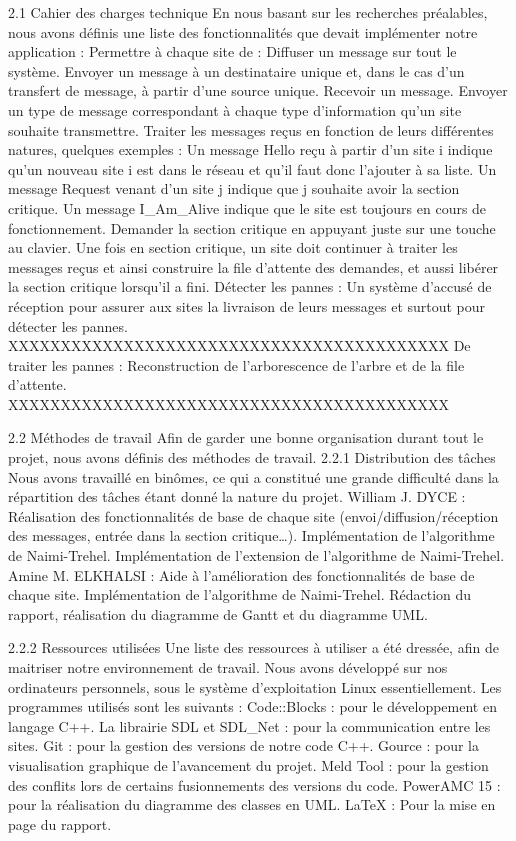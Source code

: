 \documentclass[a4paper,french,towsides,10pt]{book}
\begin{document}
2.1 Cahier des charges technique
En nous basant sur les recherches préalables, nous avons définis une liste des fonctionnalités que devait implémenter notre application :
Permettre à chaque site de :
Diffuser un message sur tout le système.
Envoyer un message à un destinataire unique et, dans le cas d’un transfert de message, à partir d’une source unique.
Recevoir un message.
Envoyer un type de message correspondant à chaque type d’information qu’un site souhaite transmettre.
Traiter les messages reçus en fonction de leurs différentes natures, quelques exemples :
Un message Hello reçu à partir d’un site i indique qu’un nouveau site i est dans le réseau et qu’il faut donc l’ajouter à sa liste.
Un message Request venant d’un site j indique que j souhaite avoir la section critique.
Un message I\_Am\_Alive indique que le site est toujours en cours de fonctionnement.
Demander la section critique en appuyant juste sur une touche au clavier.
Une fois en section critique, un site doit continuer à traiter les messages reçus et ainsi construire la file d’attente des demandes, et aussi libérer la section critique lorsqu’il a fini.
Détecter les pannes :
Un système d’accusé de réception pour assurer aux sites la livraison de leurs messages et surtout pour détecter les pannes.
XXXXXXXXXXXXXXXXXXXXXXXXXXXXXXXXXXXXXXXXXX
De traiter les pannes :
Reconstruction de l’arborescence de l’arbre et de la file d’attente.
XXXXXXXXXXXXXXXXXXXXXXXXXXXXXXXXXXXXXXXXXX



2.2 Méthodes de travail
	Afin de garder une bonne organisation durant tout le projet, nous avons définis des méthodes de travail.
2.2.1 Distribution des tâches
	Nous avons travaillé en binômes, ce qui a constitué une grande difficulté dans la répartition des tâches étant donné la nature du projet.
William J. DYCE : Réalisation des fonctionnalités de base de chaque site (envoi/diffusion/réception des messages, entrée dans la section critique…). Implémentation de l’algorithme de Naimi-Trehel. Implémentation de l’extension de l’algorithme de Naimi-Trehel.
Amine M. ELKHALSI : Aide à l’amélioration des fonctionnalités de base de chaque site. Implémentation de l’algorithme de Naimi-Trehel. Rédaction du rapport, réalisation du diagramme de Gantt et du diagramme UML.

2.2.2 Ressources utilisées
Une liste des ressources à utiliser a été dressée, afin de maitriser notre environnement de travail.
Nous avons développé sur nos ordinateurs personnels, sous le système d’exploitation Linux essentiellement.
Les programmes utilisés sont les suivants :
Code::Blocks : pour le développement en langage C++.
La librairie SDL et SDL\_Net : pour la communication entre les sites.
Git : pour la gestion des versions de notre code C++.
Gource : pour la visualisation graphique de l’avancement du projet.
Meld Tool : pour la gestion des conflits lors de certains fusionnements des versions du code.
PowerAMC 15 : pour la réalisation du diagramme des classes en UML.
LaTeX : Pour la mise en page du rapport.
\end{document}
